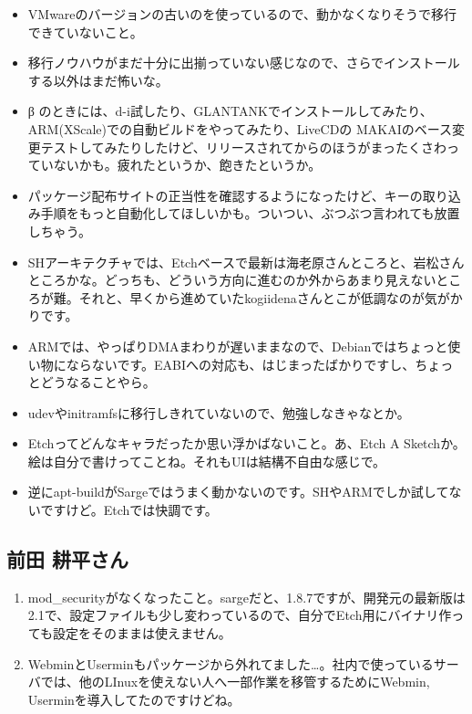 \documentclass[mingoth,a4paper]{jsarticle}
\begin{document}
\begin{itemize}
 
 \item VMwareのバージョンの古いのを使っているので、動かなくなりそうで移行できていないこと。

 \item 移行ノウハウがまだ十分に出揃っていない感じなので、さらでインストールする以外はまだ怖いな。

 \item β のときには、d-i試したり、GLANTANKでインストールしてみたり、ARM(XScale)での自動ビルドをやってみたり、LiveCDの
 MAKAIのベース変更テストしてみたりしたけど、リリースされてからのほうがまったくさわっていないかも。疲れたというか、飽きたというか。

 \item パッケージ配布サイトの正当性を確認するようになったけど、キーの取り込み手順をもっと自動化してほしいかも。ついつい、ぶつぶつ言われても放置しちゃう。

 \item SHアーキテクチャでは、Etchベースで最新は海老原さんところと、岩松さんところかな。どっちも、どういう方向に進むのか外からあまり見えないところが難。それと、早くから進めていたkogiidenaさんとこが低調なのが気がかりです。

 \item ARMでは、やっぱりDMAまわりが遅いままなので、Debianではちょっと使い物にならないです。EABIへの対応も、はじまったばかりですし、ちょっとどうなることやら。

 \item udevやinitramfsに移行しきれていないので、勉強しなきゃなとか。

 \item Etchってどんなキャラだったか思い浮かばないこと。あ、Etch A Sketchか。絵は自分で書けってことね。それもUIは結構不自由な感じで。

 \item 逆にapt-buildがSargeではうまく動かないのです。SHやARMでしか試してないですけど。Etchでは快調です。
\end{itemize}


\subsection{前田 耕平さん}

\begin{enumerate}
 \item  mod\_{}securityがなくなったこと。sargeだと、1.8.7ですが、開発元の最新版は2.1で、設定ファイルも少し変わっているので、自分でEtch用にバイナリ作っても設定をそのままは使えません。
 \item WebminとUserminもパッケージから外れてました…。社内で使っているサーバでは、他のLInuxを使えない人へ一部作業を移管するためにWebmin,
 Userminを導入してたのですけどね。
\end{enumerate}
\end{document}
